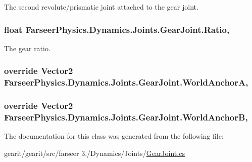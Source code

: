 The second revolute/prismatic joint attached to the gear joint. 

\hypertarget{class_farseer_physics_1_1_dynamics_1_1_joints_1_1_gear_joint_a42f723255b91a5aed105f55ad688e59a}{
\subsubsection[{Ratio}]{\setlength{\rightskip}{0pt plus 5cm}float Farseer\+Physics.\+Dynamics.\+Joints.\+Gear\+Joint.\+Ratio\hspace{0.3cm}{\ttfamily [get]}, {\ttfamily [set]}}}\label{class_farseer_physics_1_1_dynamics_1_1_joints_1_1_gear_joint_a42f723255b91a5aed105f55ad688e59a}


The gear ratio. 

\hypertarget{class_farseer_physics_1_1_dynamics_1_1_joints_1_1_gear_joint_a21997d36203f1c04571c160fdaa82912}{
\subsubsection[{World\+Anchor\+A}]{\setlength{\rightskip}{0pt plus 5cm}override Vector2 Farseer\+Physics.\+Dynamics.\+Joints.\+Gear\+Joint.\+World\+Anchor\+A\hspace{0.3cm}{\ttfamily [get]}, {\ttfamily [set]}}}\label{class_farseer_physics_1_1_dynamics_1_1_joints_1_1_gear_joint_a21997d36203f1c04571c160fdaa82912}
\hypertarget{class_farseer_physics_1_1_dynamics_1_1_joints_1_1_gear_joint_a13b1330229a1749cc4f90f391d6f6c6f}{
\subsubsection[{World\+Anchor\+B}]{\setlength{\rightskip}{0pt plus 5cm}override Vector2 Farseer\+Physics.\+Dynamics.\+Joints.\+Gear\+Joint.\+World\+Anchor\+B\hspace{0.3cm}{\ttfamily [get]}, {\ttfamily [set]}}}\label{class_farseer_physics_1_1_dynamics_1_1_joints_1_1_gear_joint_a13b1330229a1749cc4f90f391d6f6c6f}


The documentation for this class was generated from the following file\+:\begin{DoxyCompactItemize}
\item 
gearit/gearit/src/farseer 3./\+Dynamics/\+Joints/\hyperlink{_gear_joint_8cs}{Gear\+Joint.\+cs}\end{DoxyCompactItemize}
